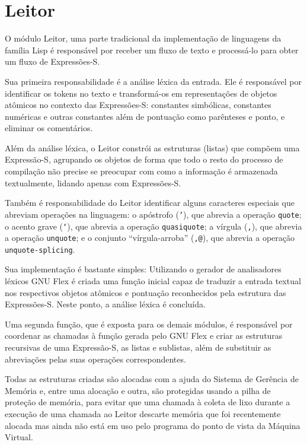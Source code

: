 \section{Leitor}
\label{sec:leitor}

O módulo Leitor, uma parte tradicional da implementação de linguagens da
família Lisp é responsável por receber um fluxo de texto e processá-lo para
obter um fluxo de Expressões-S.

Sua primeira responsabilidade é a análise léxica da entrada. Ele é responsável
por identificar os tokens no texto e transformá-os em representações de
objetos atômicos no contexto das Expressões-S: constantes simbólicas,
constantes numéricas e outras constantes além de pontuação como parênteses e
ponto, e eliminar os comentários. 

Além da análise léxica, o Leitor constrói as estruturas
(listas) que compõem uma Expressão-S, agrupando os objetos de forma que todo o
resto do processo de compilação não precise se preocupar com como a informação
é armazenada textualmente, lidando apenas com Expressões-S.

Também é responsabilidade do Leitor identificar alguns caracteres especiais que
abreviam operações na linguagem: o apóstrofo (\texttt{'}), que abrevia a operação
\texttt{quote}; o acento grave (\texttt{`}), que abrevia a operação \texttt{quasiquote};
a vírgula (\texttt{,}), que abrevia a operação \texttt{unquote}; e o conjunto
``vírgula-arroba'' (\texttt{,@}), que abrevia a operação \texttt{unquote-splicing}.

Sua implementação é bastante simples: Utilizando o gerador de analisadores
léxicos GNU Flex\cite{gnu:flex} é criada uma função inicial capaz de traduzir a entrada
textual nos respectivos objetos atômicos e pontuação reconhecidos pela
estrutura das Expressões-S. Neste ponto, a análise léxica é concluída. 

Uma segunda função, que é exposta para os demais módulos, é responsável por
coordenar as chamadas à função gerada pelo GNU Flex e criar as estruturas
recursivas de uma Expressão-S, as listas e sublistas, além de substituir as 
abreviações pelas suas operações correspondentes.

Todas as estruturas criadas são alocadas com a ajuda do Sistema de Gerência de
Memória e, entre uma alocação e outra, são protegidas usando a pilha de
proteção de memória, para evitar que uma chamada à coleta de lixo durante a
execução de uma chamada ao Leitor descarte memória que foi recentemente alocada
mas ainda não está em uso pelo programa do ponto de vista da Máquina Virtual.




